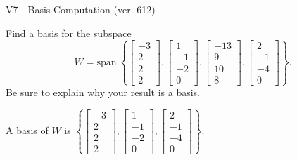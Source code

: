 \begin{exercise}
  \begin{exerciseTitle}V7 - Basis Computation (ver. 612)\end{exerciseTitle}
  \begin{exerciseStatement}
    Find a basis for the subspace 
\[W=\mathrm{span}\ \left\{\left[\begin{array}{r}
-3 \\
2 \\
2 \\
2
\end{array}\right] , \left[\begin{array}{r}
1 \\
-1 \\
-2 \\
0
\end{array}\right] , \left[\begin{array}{r}
-13 \\
9 \\
10 \\
8
\end{array}\right] , \left[\begin{array}{r}
2 \\
-1 \\
-4 \\
0
\end{array}\right]\right\}.\]
 Be sure to explain why your result is a basis.


  \end{exerciseStatement}
  \begin{exerciseAnswer}
   A basis of \(W\) is  \(\left\{\left[\begin{array}{r}
-3 \\
2 \\
2 \\
2
\end{array}\right] , \left[\begin{array}{r}
1 \\
-1 \\
-2 \\
0
\end{array}\right] , \left[\begin{array}{r}
2 \\
-1 \\
-4 \\
0
\end{array}\right]\right\}\).
  


  \end{exerciseAnswer}
\end{exercise}